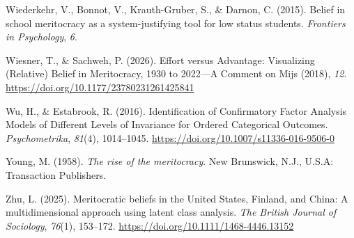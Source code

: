 \documentclass[
  13pt,
]{article}
\newlength{\cslhangindent}
\newenvironment{CSLReferences}[2] %
 {\begin{list}{}{%
  \setlength{\itemindent}{0pt}
  \setlength{\leftmargin}{0pt}
  \setlength{\parsep}{0pt}
  \ifodd #1
   \setlength{\leftmargin}{\cslhangindent}
   \setlength{\itemindent}{-1\cslhangindent}
  \fi
  \setlength{\itemsep}{#2\baselineskip}}}
 {\end{list}}
\begin{document}
\begin{CSLReferences}{1}{0}
Wiederkehr, V., Bonnot, V., Krauth-Gruber, S., \& Darnon, C. (2015).
Belief in school meritocracy as a system-justifying tool for low status
students. \emph{Frontiers in Psychology}, \emph{6}.

Wiesner, T., \& Sachweh, P. (2026). Effort versus {Advantage}:
{Visualizing} ({Relative}) {Belief} in {Meritocracy}, 1930 to 2022---{A
Comment} on {Mijs} (2018), \emph{12}.
\url{https://doi.org/10.1177/23780231261425841}

Wu, H., \& Estabrook, R. (2016). Identification of {Confirmatory Factor
Analysis Models} of {Different Levels} of {Invariance} for {Ordered
Categorical Outcomes}. \emph{Psychometrika}, \emph{81}(4), 1014--1045.
\url{https://doi.org/10.1007/s11336-016-9506-0}

Young, M. (1958). \emph{The rise of the meritocracy}. New Brunswick,
N.J., U.S.A: Transaction Publishers.

Zhu, L. (2025). Meritocratic beliefs in the {United States}, {Finland},
and {China}: {A} multidimensional approach using latent class analysis.
\emph{The British Journal of Sociology}, \emph{76}(1), 153--172.
\url{https://doi.org/10.1111/1468-4446.13152}

\end{CSLReferences}
\end{document}
